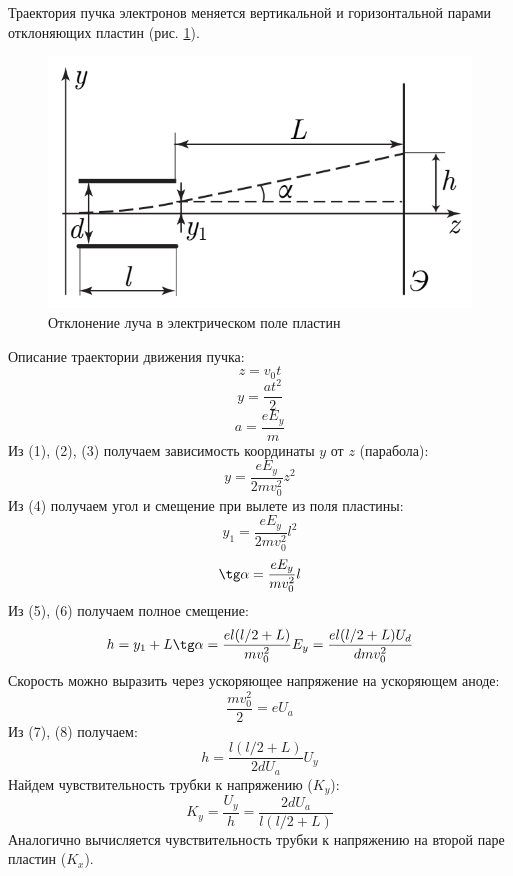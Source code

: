 \documentclass[a4paper, 12pt]{article}
\begin{document}
Траектория пучка электронов меняется вертикальной и горизонтальной парами отклоняющих пластин (рис. \ref{fig:plates}).
\begin{figure}[h]
    \centering
    \includegraphics{plates.png}
    \caption{Отклонение луча в электрическом поле пластин}
    \label{fig:plates}
\end{figure}
Описание траектории движения пучка:
\begin{equation}
    z = v_0t
\end{equation}
\begin{equation}
    y=\frac{at^2}{2}
\end{equation}
\begin{equation}
    a=\frac{eE_y}{m}
\end{equation}
Из (1), (2), (3) получаем зависимость координаты $y$ от $z$ (парабола):
\begin{equation}
    y = \frac{eE_y}{2mv_0^2}z^2
\end{equation}
Из (4) получаем угол и смещение при вылете из поля пластины:
\begin{equation}
    y_1 = \frac{eE_y}{2mv_0^2}l^2
\end{equation}
\begin{equation}
    \tg\alpha = \frac{eE_y}{mv_0^2}l
\end{equation}
Из (5), (6) получаем полное смещение:
\begin{equation}
    h = y_1 + L\tg\alpha=\frac{el(l/2+L)}{mv_0^2}E_y = \frac{el(l/2+L)U_d}{dmv_0^2}
\end{equation}
Скорость можно выразить через ускоряющее напряжение на ускоряющем аноде:
\begin{equation}
    \frac{mv_0^2}{2}=eU_a
\end{equation}
Из (7), (8) получаем:
\begin{equation}
    h=\frac{l(l/2 +L)}{2dU_a}U_y
\end{equation}
Найдем чувствительность трубки к напряжению ($K_y$):
\begin{equation}
    K_y=\frac{U_y}{h} = \frac{2dU_a}{l(l/2+L)}
\end{equation}
Аналогично вычисляется чувствительность трубки к напряжению на
второй паре пластин ($K_x$).
\end{document}
